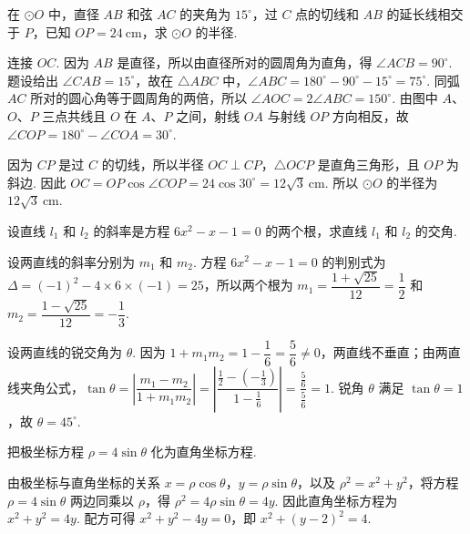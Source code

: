 \begin{problem}
在 \(\odot O\) 中，直径 \(AB\) 和弦 \(AC\) 的夹角为 \(15^\circ\)，过 \(C\) 点的切线和 \(AB\) 的延长线相交于 \(P\)，已知 \(OP=24\mathrm{~cm}\)，求 \(\odot O\) 的半径.

\end{problem}

\begin{solution}
连接 \(OC\). 因为 \(AB\) 是直径，所以由直径所对的圆周角为直角，得 \(\angle ACB=90^\circ\). 题设给出 \(\angle CAB=15^\circ\)，故在 \(\triangle ABC\) 中，\(\angle ABC=180^\circ-90^\circ-15^\circ=75^\circ\). 同弧 \(AC\) 所对的圆心角等于圆周角的两倍，所以 \(\angle AOC=2\angle ABC=150^\circ\). 由图中 \(A\)、\(O\)、\(P\) 三点共线且 \(O\) 在 \(A\)、\(P\) 之间，射线 \(OA\) 与射线 \(OP\) 方向相反，故 \(\angle COP=180^\circ-\angle COA=30^\circ\).

因为 \(CP\) 是过 \(C\) 的切线，所以半径 \(OC\perp CP\)，\(\triangle OCP\) 是直角三角形，且 \(OP\) 为斜边. 因此 \(OC=OP\cos\angle COP=24\cos30^\circ=12\sqrt{3}\mathrm{~cm}\). 所以 \(\odot O\) 的半径为 \(12\sqrt{3}\mathrm{~cm}\).
\end{solution}

\begin{problem}
设直线 \(l_1\) 和 \(l_2\) 的斜率是方程 \(6x^2-x-1=0\) 的两个根，求直线 \(l_1\) 和 \(l_2\) 的交角.
\end{problem}

\begin{solution}
设两直线的斜率分别为 \(m_1\) 和 \(m_2\). 方程 \(6x^2-x-1=0\) 的判别式为 \(\Delta=(-1)^2-4\times6\times(-1)=25\)，所以两个根为 \(m_1=\dfrac{1+\sqrt{25}}{12}=\dfrac{1}{2}\) 和 \(m_2=\dfrac{1-\sqrt{25}}{12}=-\dfrac{1}{3}\).

设两直线的锐交角为 \(\theta\). 因为 \(1+m_1m_2=1-\dfrac{1}{6}=\dfrac{5}{6}\ne0\)，两直线不垂直；由两直线夹角公式，\(\tan\theta=\left|\dfrac{m_1-m_2}{1+m_1m_2}\right|=\left|\dfrac{\frac{1}{2}-\left(-\frac{1}{3}\right)}{1-\frac{1}{6}}\right|=\dfrac{\frac{5}{6}}{\frac{5}{6}}=1\). 锐角 \(\theta\) 满足 \(\tan\theta=1\)，故 \(\theta=45^\circ\).
\end{solution}

\begin{problem}
把极坐标方程 \(\rho=4\sin\theta\) 化为直角坐标方程.
\end{problem}

\begin{solution}
由极坐标与直角坐标的关系 \(x=\rho\cos\theta\)，\(y=\rho\sin\theta\)，以及 \(\rho^2=x^2+y^2\)，将方程 \(\rho=4\sin\theta\) 两边同乘以 \(\rho\)，得 \(\rho^2=4\rho\sin\theta=4y\). 因此直角坐标方程为 \(x^2+y^2=4y\). 配方可得 \(x^2+y^2-4y=0\)，即 \(x^2+(y-2)^2=4\).
\end{solution}

